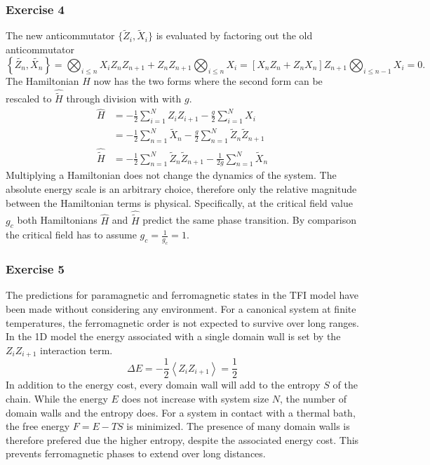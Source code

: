 \subsubsection{Exercise 4}
The new anticommutator $\{\tilde{Z}_i, \tilde{X}_i\}$ is evaluated by factoring out the old anticommutator
\begin{equation}
    \left\{\tilde{Z_n}, \tilde{X_n}\right\} = \bigotimes_{i \leq n}X_iZ_nZ_{n+1} + Z_nZ_{n+1}\bigotimes_{i \leq n}X_i = \left[X_nZ_n + Z_nX_n\right]Z_{n+1}\bigotimes_{i \leq n-1}X_i = 0.
\end{equation}
The Hamiltonian $H$ now has the two forms where the second form can be rescaled to $\hat{\tilde{H}}$ through division with with $g$.
\begin{align}
    \hat{H} &= -\frac{1}{2}\sum^{N}_{i=1}Z_iZ_{i+1} - \frac{g}{2}\sum^N_{i=1}X_i\\
    &= - \frac{1}{2}\sum^{N}_{n=1}\tilde{X}_n - \frac{g}{2}\sum^{N}_{n=1}\tilde{Z}_n\tilde{Z}_{n+1} \\
    \hat{\tilde{H}} &= - \frac{1}{2}\sum^{N}_{n=1}\tilde{Z}_n\tilde{Z}_{n+1} - \frac{1}{2g}\sum^{N}_{n=1}\tilde{X}_n 
\end{align}
Multiplying a Hamiltonian does not change the dynamics of the system. The absolute energy scale is an arbitrary choice, therefore only the relative magnitude between the Hamiltonian terms is physical. Specifically, at the critical field value $g_c$ both Hamiltonians $\hat{H}$ and $\hat{\tilde{H}}$ predict the same phase transition. By comparison the critical field has to assume $g_c = \frac{1}{g_c} = 1$.
\subsubsection{Exercise 5}
The predictions for paramagnetic and ferromagnetic states in the TFI model have been made without considering any environment. For a canonical system at finite temperatures, the ferromagnetic order is not expected to survive over long ranges. In the 1D model the energy associated with a single domain wall is set by the $Z_iZ_{i+1}$ interaction term.
\begin{equation}
    \Delta E = - \frac{1}{2}\left<Z_iZ_{i+1}\right> = \frac{1}{2}
\end{equation}
In addition to the energy cost, every domain wall will add to the entropy $S$ of the chain. While the energy $E$ does not increase with system size $N$, the number of domain walls and the entropy does. For a system in contact with a thermal bath, the free energy $F = E - TS$ is minimized. The presence of many domain walls is therefore prefered due the higher entropy, despite the associated energy cost. This prevents ferromagnetic phases to extend over long distances.
